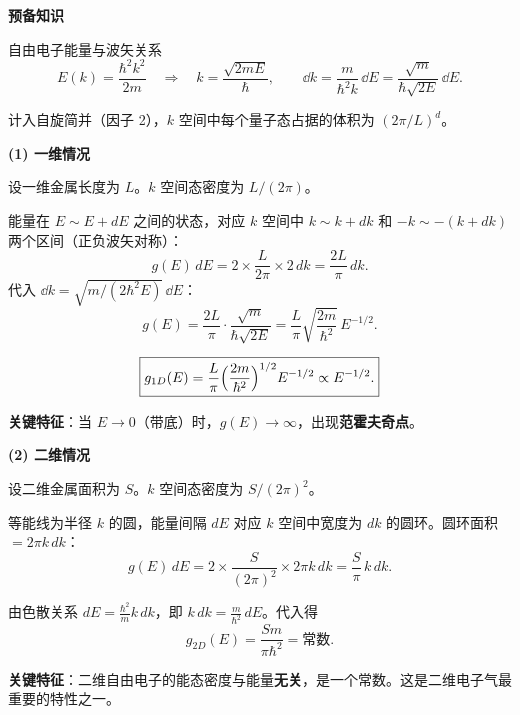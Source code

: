 \begin{derivationbox}[标准解题过程]
\textbf{预备知识}

自由电子能量与波矢关系
\begin{equation}
E(k) = \frac{\hbar^2k^2}{2m}
\quad\Longrightarrow\quad
k = \frac{\sqrt{2mE}}{\hbar},\qquad
\dd{k} = \frac{m}{\hbar^2k}\,\dd{E} = \frac{\sqrt{m}}{\hbar\sqrt{2E}}\,\dd{E}.
\end{equation}

计入自旋简并（因子 2），$k$ 空间中每个量子态占据的体积为 $(2\pi/L)^d$。

\textbf{(1) 一维情况}

设一维金属长度为 $L$。$k$ 空间态密度为 $L/(2\pi)$。

能量在 $E\sim E+dE$ 之间的状态，对应 $k$ 空间中 $k\sim k+dk$ 和 $-k\sim -(k+dk)$ 两个区间（正负波矢对称）：
\begin{equation}
g(E)\,dE = 2\times\frac{L}{2\pi}\times 2\,dk = \frac{2L}{\pi}\,dk.
\end{equation}
代入 $\dd{k}=\sqrt{m/(2\hbar^2E)}\,\dd{E}$：
\begin{equation}
g(E) = \frac{2L}{\pi}\cdot\frac{\sqrt{m}}{\hbar\sqrt{2E}}
= \frac{L}{\pi}\sqrt{\frac{2m}{\hbar^2}}\,E^{-1/2}.
\end{equation}

\begin{equation}
\boxed{g_{1D}(E) = \frac{L}{\pi}\Bigl(\frac{2m}{\hbar^2}\Bigr)^{1/2} E^{-1/2}\propto E^{-1/2}.}
\end{equation}

\textbf{关键特征}：当 $E\to0$（带底）时，$g(E)\to\infty$，出现\textbf{范霍夫奇点}。

\textbf{(2) 二维情况}

设二维金属面积为 $S$。$k$ 空间态密度为 $S/(2\pi)^2$。

等能线为半径 $k$ 的圆，能量间隔 $dE$ 对应 $k$ 空间中宽度为 $dk$ 的圆环。圆环面积 $=2\pi k\,dk$：
\begin{equation}
g(E)\,dE = 2\times\frac{S}{(2\pi)^2}\times 2\pi k\,dk = \frac{S}{\pi}\,k\,dk.
\end{equation}

由色散关系 $dE = \frac{\hbar^2}{m}k\,dk$，即 $k\,dk = \frac{m}{\hbar^2}\,dE$。代入得
\begin{equation}
\boxed{g_{2D}(E) = \frac{Sm}{\pi\hbar^2}=\text{常数}.}
\end{equation}

\textbf{关键特征}：二维自由电子的能态密度与能量\textbf{无关}，是一个常数。这是二维电子气最重要的特性之一。


\end{derivationbox}
